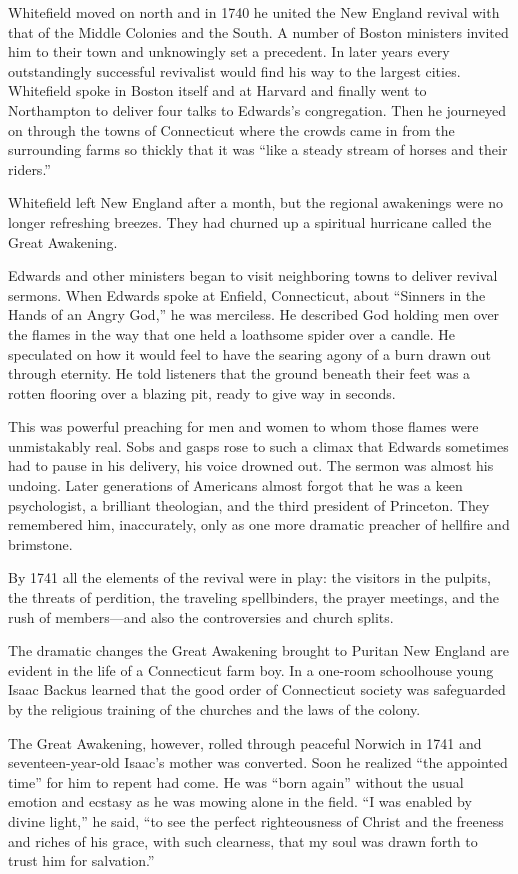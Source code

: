 Whitefield moved on north and in 1740 he united the New England revival with that of the Middle
Colonies and the South. A number of Boston ministers invited him to their town and unknowingly set a
precedent. In later years every outstandingly successful revivalist would find his way to the
largest cities. Whitefield spoke in Boston itself and at Harvard and finally went to Northampton to
deliver four talks to Edwards’s congregation. Then he journeyed on through the towns of Connecticut
where the crowds came in from the surrounding farms so thickly that it was “like a steady stream of
horses and their riders.”

Whitefield left New England after a month, but the regional awakenings were no longer refreshing
breezes. They had churned up a spiritual hurricane called the Great Awakening.

Edwards and other ministers began to visit neighboring towns to deliver revival sermons. When
Edwards spoke at Enfield, Connecticut, about “Sinners in the Hands of an Angry God,” he was
merciless. He described God holding men over the flames in the way that one held a loathsome spider
over a candle. He speculated on how it would feel to have the searing agony of a burn drawn out
through eternity. He told listeners that the ground beneath their feet was a rotten flooring over a
blazing pit, ready to give way in seconds.

This was powerful preaching for men and women to whom those flames were unmistakably real. Sobs and
gasps rose to such a climax that Edwards sometimes had to pause in his delivery, his voice drowned
out. The sermon was almost his undoing. Later generations of Americans almost forgot that he was a
keen psychologist, a brilliant theologian, and the third president of Princeton. They remembered
him, inaccurately, only as one more dramatic preacher of hellfire and brimstone.

By 1741 all the elements of the revival were in play: the visitors in the pulpits, the threats of
perdition, the traveling spellbinders, the prayer meetings, and the rush of members—and also the
controversies and church splits.

The dramatic changes the Great Awakening brought to Puritan New England are evident in the life of a
Connecticut farm boy. In a one-room schoolhouse young Isaac Backus learned that the good order of
Connecticut society was safeguarded by the religious training of the churches and the laws of the
colony.

The Great Awakening, however, rolled through peaceful Norwich in 1741 and seventeen-year-old Isaac’s
mother was converted. Soon he realized “the appointed time” for him to repent had come. He was “born
again” without the usual emotion and ecstasy as he was mowing alone in the field. “I was enabled by
divine light,” he said, “to see the perfect righteousness of Christ and the freeness and riches of
his grace, with such clearness, that my soul was drawn forth to trust him for salvation.”

